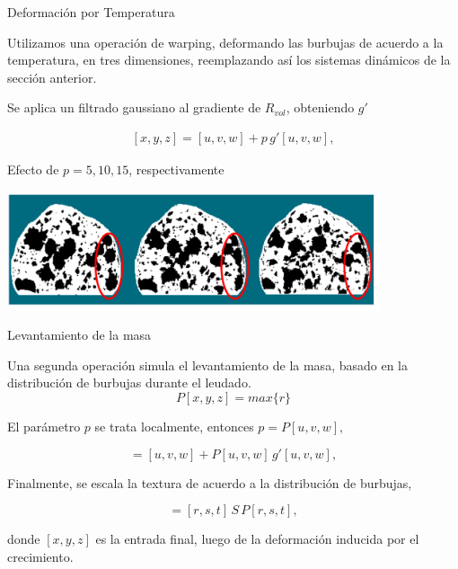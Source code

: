 \documentclass[spanish]{beamer}
\begin{document}
\begin{frame}{Deformación por Temperatura}

Utilizamos una operación de warping, deformando las burbujas de acuerdo a la temperatura, en tres dimensiones, reemplazando así los sistemas dinámicos de la sección anterior.

Se aplica un filtrado gaussiano al gradiente de $R_{vol}$, obteniendo $g'$

\begin{align*}
\displaystyle
[x,y,z] = [u,v,w] + p\, g'[u,v,w],
\end{align*}

Efecto de $p = 5,10,15$, respectivamente
\centerline{\includegraphics[width=11cm]{../figures/parameterp}}

\end{frame}

\begin{frame}{Levantamiento de la masa}

Una segunda operación simula el levantamiento de la masa, basado en la distribución de burbujas durante el leudado.
\begin{equation*}
P[x,y,z] = max \bigg\{r\bigg\}
\end{equation*}

El parámetro $p$ se trata localmente, entonces $p = P[u,v,w],$

\begin{equation*}
[r,s,t] = [u,v,w] + P[u,v,w] \, g'[u,v,w],
\end{equation*}



Finalmente, se escala la textura de acuerdo a la distribución de burbujas,


\begin{equation}
[x,y,z] = [r,s,t]\, S \, P[r,s,t],
\end{equation}

\noindent donde $[x,y,z]$ es la entrada final, luego de la deformación inducida por el crecimiento.

\end{frame}
\end{document}

